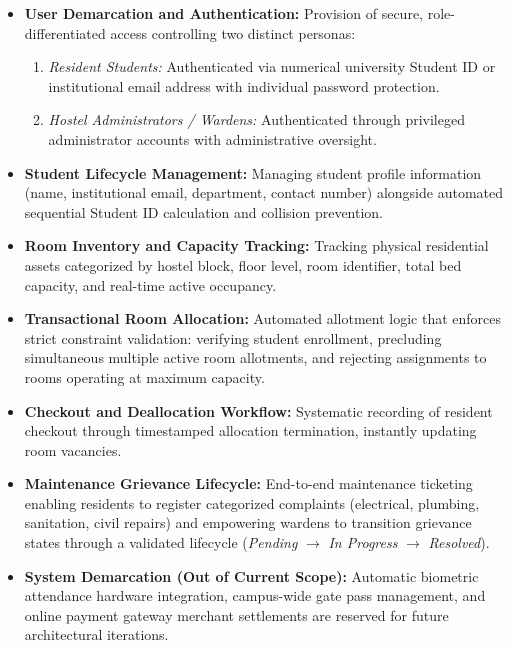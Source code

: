 \documentclass[12pt,a4paper]{article}
\begin{document}
\begin{itemize}
    \item \textbf{User Demarcation and Authentication:} Provision of secure, role-differentiated access controlling two distinct personas:
    \begin{enumerate}
        \item \textit{Resident Students:} Authenticated via numerical university Student ID or institutional email address with individual password protection.
        \item \textit{Hostel Administrators / Wardens:} Authenticated through privileged administrator accounts with administrative oversight.
    \end{enumerate}
    \item \textbf{Student Lifecycle Management:} Managing student profile information (name, institutional email, department, contact number) alongside automated sequential Student ID calculation and collision prevention.
    \item \textbf{Room Inventory and Capacity Tracking:} Tracking physical residential assets categorized by hostel block, floor level, room identifier, total bed capacity, and real-time active occupancy.
    \item \textbf{Transactional Room Allocation:} Automated allotment logic that enforces strict constraint validation: verifying student enrollment, precluding simultaneous multiple active room allotments, and rejecting assignments to rooms operating at maximum capacity.
    \item \textbf{Checkout and Deallocation Workflow:} Systematic recording of resident checkout through timestamped allocation termination, instantly updating room vacancies.
    \item \textbf{Maintenance Grievance Lifecycle:} End-to-end maintenance ticketing enabling residents to register categorized complaints (electrical, plumbing, sanitation, civil repairs) and empowering wardens to transition grievance states through a validated lifecycle (\textit{Pending} $\rightarrow$ \textit{In Progress} $\rightarrow$ \textit{Resolved}).
    \item \textbf{System Demarcation (Out of Current Scope):} Automatic biometric attendance hardware integration, campus-wide gate pass management, and online payment gateway merchant settlements are reserved for future architectural iterations.
\end{itemize}

\end{document}
